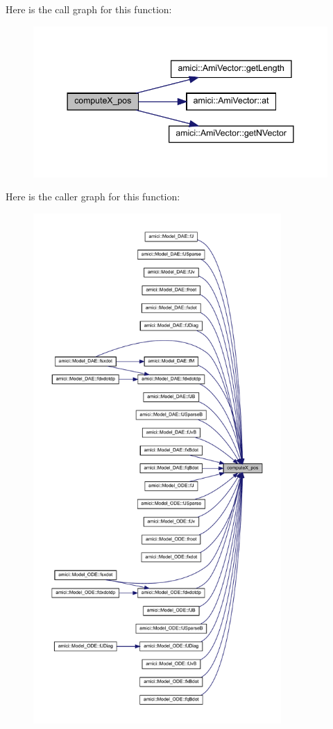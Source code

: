 Here is the call graph for this function\+:
\nopagebreak
\begin{figure}[H]
\begin{center}
\leavevmode
\includegraphics[width=344pt]{classamici_1_1_model_a0c06c5326bb82ceedba30171c122cb8a_cgraph}
\end{center}
\end{figure}
Here is the caller graph for this function\+:
\nopagebreak
\begin{figure}[H]
\begin{center}
\leavevmode
\includegraphics[height=550pt]{classamici_1_1_model_a0c06c5326bb82ceedba30171c122cb8a_icgraph}
\end{center}
\end{figure}
\mbox{\label{classamici_1_1_model_a67a909ae629c7a8e31c07e0937b9be3f}} 
